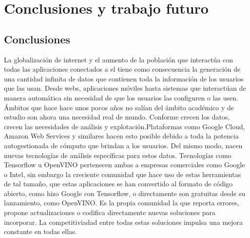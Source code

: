 \cleardoublepage
\mbox{}

\chapter{Conclusiones y trabajo futuro}
\label{ch:chapte6}

\section{Conclusiones}\label{sec:conclusiones}
La globalización de internet y el aumento de la población que interactúa con todas las aplicaciones conectados a el tiene como consecuencia
la generación de una cantidad infinita de datos que contienen toda la información de los usuarios que las usan.
Desde webs, aplicaciones móviles hasta sistemas que interactúan de manera automática sin necesidad de que los usuarios las configuren o las usen.
Ámbitos que hace hace unos pocos años no salían del ámbito académico y de estudio son ahora una necesidad real de mundo.
Conforme crecen los datos, crecen las necesidades de análisis y explotación.Plataformas como Google Cloud, Amazon Web Services y similares hacen esto posible
debido a toda la potencia autogestionada de cómputo que brindan a los usuarios.
Del mismo modo, nacen nuevas tecnologías de análisis específicas para estos datos.
Tecnologías como Tensorflow u OpenVINO pertenecen ambas a empresas comerciales como Google o Intel, sin embargo la creciente comunidad que hace uso de estas
herramientas de tal tamaño, que estas aplicaciones se han convertido al formato de código abierto, como hizo Google con Tensorflow, o directamente son gratuitas desde su lanzamiento, como OpenVINO.
Es la propia comunidad la que reporta errores, propone actualizaciones o codifica directamente nuevas soluciones para incorporar.
La competitiviadad entre todas estas soluciones impulsa una mejora constante en todas ellas.



